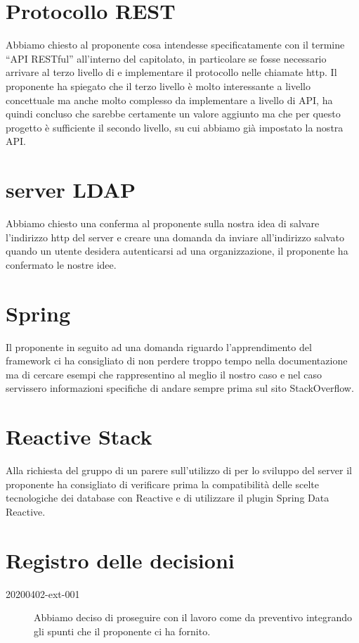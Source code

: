 \documentclass{article}
\begin{document}
\section{Protocollo REST}%
\label{sec:protocollo_rest}
Abbiamo chiesto al proponente cosa intendesse specificatamente con il termine ``API RESTful'' all'interno del capitolato, in particolare se fosse necessario arrivare al terzo livello di  e implementare il protocollo  nelle chiamate http.
Il proponente ha spiegato che il terzo livello è molto interessante a livello concettuale ma anche molto complesso da implementare a livello di API, ha quindi concluso che sarebbe certamente un valore aggiunto ma che per questo progetto è sufficiente il secondo livello, su cui abbiamo già impostato la nostra API\@.

\section{server LDAP}%
\label{sec:server_ldap}
Abbiamo chiesto una conferma al proponente sulla nostra idea di salvare l'indirizzo http del server  e creare una domanda da inviare all'indirizzo salvato quando un utente desidera autenticarsi ad una organizzazione, il proponente ha confermato le nostre idee.

\section{Spring}%
\label{sec:spring}
Il proponente in seguito ad una domanda riguardo l'apprendimento del framework  ci ha consigliato di non perdere troppo tempo nella documentazione ma di cercare esempi che rappresentino al meglio il nostro caso e nel caso servissero informazioni specifiche di andare sempre prima sul sito StackOverflow.

\section{Reactive Stack}%
\label{sec:reactive_stack}
Alla richiesta del gruppo di un parere sull'utilizzo di  per lo sviluppo del server il proponente ha consigliato di verificare prima la compatibilità delle scelte tecnologiche dei database con Reactive e di utilizzare il plugin Spring Data Reactive.


\newpage
\section{Registro delle decisioni}%
\label{sec:registro_delle_decisioni}

\begin{description}
  \item[20200402-ext-001] Abbiamo deciso di proseguire con il lavoro come da preventivo integrando gli spunti che il proponente ci ha fornito.
\end{description}
\end{document}
